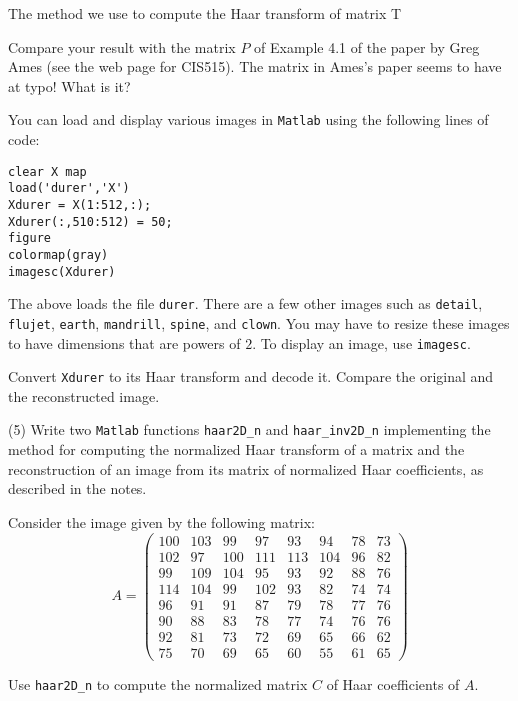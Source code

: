 \documentclass[12pt]{article}
\begin{document}
The method we use to compute the Haar transform of matrix T














Compare your result with the matrix $P$ of Example 4.1 of the paper by
Greg Ames (see the web page for CIS515). The matrix in Ames's paper
seems to have at typo! What is it?

\medskip
You can load and display 
various images in {\tt Matlab} using the following lines of code:
\begin{verbatim}
clear X map
load('durer','X')
Xdurer = X(1:512,:);
Xdurer(:,510:512) = 50;
figure
colormap(gray)
imagesc(Xdurer)
\end{verbatim}
The above loads the file {\tt durer}.
There are a few other  images such as {\tt detail}, {\tt flujet}, {\tt earth},
{\tt mandrill}, {\tt spine}, and {\tt clown}. You may have to resize
these images to have dimensions that are powers of $2$.
To display an image, use {\tt imagesc}.

\medskip
Convert {\tt Xdurer}  to its Haar transform and decode it. Compare the
original and the reconstructed image.


\medskip
(5)
Write two {\tt Matlab} functions {\tt haar2D\_n} and {\tt haar\_inv2D\_n}
implementing the method for computing the normalized Haar transform
of a  matrix and the reconstruction of an image from its matrix of
normalized Haar
coefficients, as described in the notes.

\medskip
Consider the image given by the following matrix:
\[
A =
\begin{pmatrix}
100 & 103 & 99 & 97 & 93 & 94 & 78 & 73 \\
 102 & 97 & 100 & 111 & 113 & 104 & 96 & 82 \\
 99 & 109 & 104 & 95 & 93 & 92 & 88 & 76 \\
 114 & 104 &  99 & 102 & 93 & 82 & 74 & 74 \\
 96 & 91 & 91 & 87 & 79 & 78 & 77 & 76 \\
 90 & 88 & 83 & 78 & 77 & 74 & 76 & 76 \\
 92 & 81 & 73 & 72 & 69 & 65 & 66 & 62 \\
 75 & 70 & 69 & 65 & 60 & 55 & 61 & 65
\end{pmatrix}
\]

Use {\tt haar2D\_n} to compute the normalized matrix $C$ of Haar
coefficients of $A$.
\end{document}
